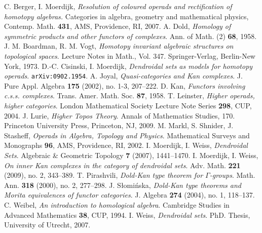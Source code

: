 \documentclass[a4paper]{amsart}
\theoremstyle{plain}
\theoremstyle{definition}
\theoremstyle{remark}
\numberwithin{equation}{section}
\numberwithin{figure}{section}
\begin{document}
\begin{thebibliography}{999}
     C. Berger, I. Moerdijk, {\em Resolution of coloured operads and rectification of homotopy
            algebras.} Categories in algebra, geometry and mathematical physics, Contemp. Math. {\bf 431}, AMS, Providence, RI, 2007.
     A. Dold, {\em Homology of symmetric products and other functors of complexes}.  Ann. of Math. (2) {\bf 68},
    1958.
     J. M. Boardman, R. M. Vogt, \textit{Homotopy invariant
        algebraic structures on topological spaces}. Lecture Notes in
    Math., Vol. 347. Springer-Verlag, Berlin-New York, 1973.
     D.-C. Cisinski, I. Moerdijk, {\em Dendroidal sets as models for homotopy operads}.
    {\tt arXiv:0902.1954}.
     A. Joyal, {\em Quasi-categories and Kan complexes}.
    J. Pure Appl. Algebra {\bf 175} (2002), no. 1-3, 207--222.
     D. Kan, {\em Functors involving c.s.s. complexes}. Trans. Amer. Math. Soc. {\bf 87}, 1958.
     T. Leinster, {\em Higher operads, higher categories}. London Mathematical Society Lecture Note Series {\bf
            298}, CUP, 2004.
     J. Lurie, {\em Higher Topos Theory}. Annals of Mathematics Studies, 170. Princeton University Press,
    Princeton, NJ, 2009.
     M. Markl, S. Shnider, J. Stasheff, {\em Operads in Algebra, Topology and Physics}. Mathematical Surveys
    and Monographs {\bf 96}, AMS, Providence, RI, 2002.
     I. Moerdijk, I. Weiss, {\em Dendroidal Sets}. Algebraic \& Geometric Topology {\bf 7} (2007),
    1441--1470.
     I. Moerdijk, I. Weiss, {\em On inner Kan complexes in the category of dendroidal sets}.
    Adv. Math. {\bf 221} (2009), no. 2, 343--389.
     T. Pirashvili, {\em Dold-Kan type theorem for $\Gamma$-groups}. Math. Ann. {\bf 318} (2000), no. 2, 277--298.
    J. S{\l}omi{\'n}ska, {\em Dold-Kan type theorems and Morita equivalences of functor categories}. J. Algebra {\bf 274}
    (2004), no. 1, 118--137.
     C. Weibel, {\em An introduction to homological algebra}. Cambridge Studies in Advanced Mathematics
        {\bf 38}, CUP, 1994.
     I. Weiss, {\em Dendroidal sets}. PhD. Thesis, University of Utrecht, 2007.
\end{thebibliography}
\end{document}
